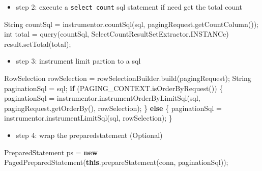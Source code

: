 \documentclass[
]{book}
\newenvironment{Shaded}{\begin{snugshade}}{\end{snugshade}}
\newcommand{\BuiltInTok}[1]{#1}
\newcommand{\DataTypeTok}[1]{\textcolor[rgb]{0.13,0.29,0.53}{#1}}
\newcommand{\FunctionTok}[1]{\textcolor[rgb]{0.00,0.00,0.00}{#1}}
\newcommand{\KeywordTok}[1]{\textcolor[rgb]{0.13,0.29,0.53}{\textbf{#1}}}
\newcommand{\NormalTok}[1]{#1}
\providecommand{\tightlist}{%
  \setlength{\itemsep}{0pt}\setlength{\parskip}{0pt}}
\begin{document}
\begin{itemize}
\tightlist
\item
  step 2: execute a \texttt{select\ count} sql statement if need get the total count
\end{itemize}

\begin{Shaded}
\begin{Highlighting}[]
\BuiltInTok{String}\NormalTok{ countSql = instrumentor.}\FunctionTok{countSql}\NormalTok{(sql, pagingRequest.}\FunctionTok{getCountColumn}\NormalTok{());}
\DataTypeTok{int}\NormalTok{ total = }\FunctionTok{query}\NormalTok{(countSql, SelectCountResultSetExtractor.}\FunctionTok{INSTANCe}\NormalTok{)}
\NormalTok{result.}\FunctionTok{setTotal}\NormalTok{(total);}
\end{Highlighting}
\end{Shaded}

\begin{itemize}
\tightlist
\item
  step 3: instrument limit partion to a sql
\end{itemize}

\begin{Shaded}
\begin{Highlighting}[]
\NormalTok{RowSelection rowSelection = rowSelectionBuilder.}\FunctionTok{build}\NormalTok{(pagingRequest);}
\BuiltInTok{String}\NormalTok{ paginationSql = sql;}
\KeywordTok{if}\NormalTok{ (PAGING_CONTEXT.}\FunctionTok{isOrderByRequest}\NormalTok{()) \{}
\NormalTok{    paginationSql = instrumentor.}\FunctionTok{instrumentOrderByLimitSql}\NormalTok{(sql, pagingRequest.}\FunctionTok{getOrderBy}\NormalTok{(), rowSelection);}
\NormalTok{\} }\KeywordTok{else}\NormalTok{ \{}
\NormalTok{    paginationSql = instrumentor.}\FunctionTok{instrumentLimitSql}\NormalTok{(sql, rowSelection);}
\NormalTok{\}}
\end{Highlighting}
\end{Shaded}

\begin{itemize}
\tightlist
\item
  step 4: wrap the preparedstatement (Optional)
\end{itemize}

\begin{Shaded}
\begin{Highlighting}[]
\BuiltInTok{PreparedStatement}\NormalTok{ ps = }\KeywordTok{new} \FunctionTok{PagedPreparedStatement}\NormalTok{(}\KeywordTok{this}\NormalTok{.}\FunctionTok{prepareStatement}\NormalTok{(conn, paginationSql));}
\end{Highlighting}
\end{Shaded}
\end{document}
